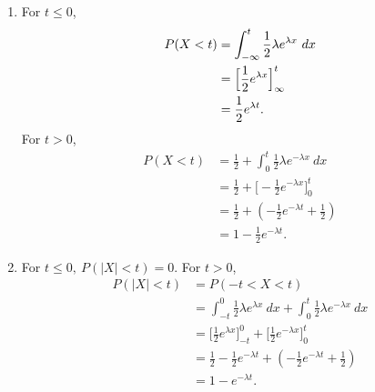 \documentclass{article}
\begin{document}
\begin{enumerate}
\begin{enumerate}
        \item For $t \leq 0$, 
        \begin{align*}
            P(X < t) 
            &= \int_{-\infty}^{t} \frac{1}{2}\lambda e^{\lambda x} \ dx \\
            &= \Big[ \frac{1}{2}e^{\lambda x} \Big]_{\-\infty}^{t} \\
            &= \frac{1}{2}e^{\lambda t}.
        \end{align*}
        For $t > 0$,
        \begin{align*}
            P (X < t) 
            &= \frac{1}{2} + \int_{0}^{t} \frac{1}{2}\lambda e^{-\lambda x} \ dx \\
            &= \frac{1}{2} + \Big[ -\frac{1}{2}e^{-\lambda x} \Big]_{0}^{t} \\
            &= \frac{1}{2} + (-\frac{1}{2}e^{-\lambda t} + \frac{1}{2}) \\
            &= 1 - \frac{1}{2}e^{-\lambda t}.
        \end{align*}

        \item For $t \leq 0, \ P(|X| < t) = 0$. For $t > 0$,
        \begin{align*}
            P(|X| < t)
            &= P(-t < X < t) \\
            &= \int_{-t}^{0} \frac{1}{2}\lambda e^{\lambda x} \ dx 
            + \int_{0}^{t} \frac{1}{2}\lambda e^{-\lambda x} \ dx \\
            &= \Big[ \frac{1}{2}e^{\lambda x} \Big]_{-t}^{0} + \Big[ \frac{1}{2}e^{-\lambda x} \Big]_{0}^{t} \\
            &= \frac{1}{2} - \frac{1}{2}e^{-\lambda t} + (-\frac{1}{2}e^{-\lambda t} + \frac{1}{2}) \\
            &= 1 - e^{-\lambda t}.
        \end{align*}
    \end{enumerate}


\end{enumerate}
\end{document}
